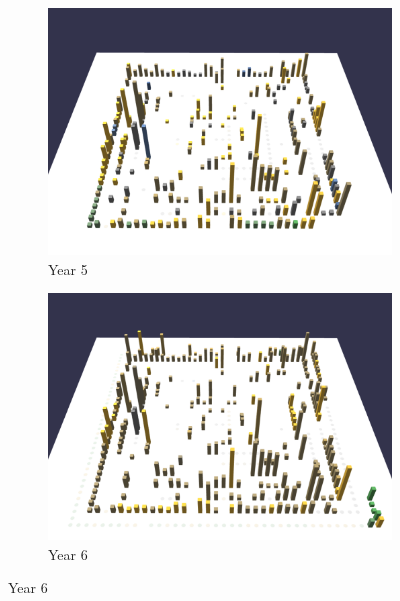 \begin{figure}[h!]    \ContinuedFloat
    \begin{subfigure}{0.48\textwidth}
        \includegraphics[width=\linewidth]{JetUML_V3S5.png}
        \caption{Year 5} 
        \label{fig:JetUML_V3S5}
    \end{subfigure}\hspace*{\fill}
    \begin{subfigure}{0.48\textwidth}
        \includegraphics[width=\linewidth]{JetUML_V3S6.png}
        \caption{Year 6} 
        \label{fig:JetUML_V3S6}
    \end{subfigure}


\end{figure}
